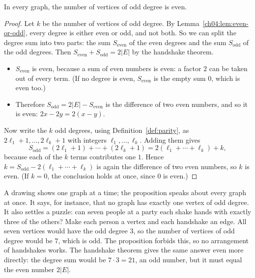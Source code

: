 \par\noindent\begin{minipage}{\linewidth}
\begin{proposition}\label{ch07:prop:odd}
In every graph, the number of vertices of odd degree is even.
\end{proposition}
\end{minipage}\par

\begin{proof}
Let $k$ be the number of vertices of odd degree. By Lemma~\ref{ch04:lem:even-or-odd}, every degree is either even or odd, and not both. So we can split the degree sum into two parts: the sum $S_{\mathrm{even}}$ of the even degrees and the sum $S_{\mathrm{odd}}$ of the odd degrees. Then $S_{\mathrm{even}}+S_{\mathrm{odd}}=2|E|$ by the handshake theorem.
\begin{itemize}
\item $S_{\mathrm{even}}$ is even, because a sum of even numbers is even: a factor $2$ can be taken out of every term. (If no degree is even, $S_{\mathrm{even}}$ is the empty sum $0$, which is even too.)
\item Therefore $S_{\mathrm{odd}}=2|E|-S_{\mathrm{even}}$ is the difference of two even numbers, and so it is even: $2x-2y=2(x-y)$.
\end{itemize}
Now write the $k$ odd degrees, using Definition~\ref{def:parity}, as $2\ell_1+1,\ldots,2\ell_k+1$ with integers $\ell_1,\ldots,\ell_k$. Adding them gives
\[
S_{\mathrm{odd}}=(2\ell_1+1)+\cdots+(2\ell_k+1)=2(\ell_1+\cdots+\ell_k)+k,
\]
because each of the $k$ terms contributes one $1$. Hence $k=S_{\mathrm{odd}}-2(\ell_1+\cdots+\ell_k)$ is again the difference of two even numbers, so $k$ is even. (If $k=0$, the conclusion holds at once, since $0$ is even.)
\end{proof}

A drawing shows one graph at a time; the proposition speaks about every graph at once. It says, for instance, that no graph has exactly one vertex of odd degree. It also settles a puzzle: can seven people at a party each shake hands with exactly three of the others? Make each person a vertex and each handshake an edge. All seven vertices would have the odd degree $3$, so the number of vertices of odd degree would be $7$, which is odd. The proposition forbids this, so no arrangement of handshakes works. The handshake theorem gives the same answer even more directly: the degree sum would be $7\cdot3=21$, an odd number, but it must equal the even number $2|E|$.
